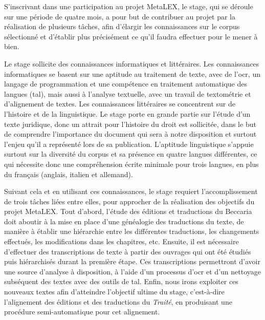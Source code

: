 
S'inscrivant dans une participation au projet MetaLEX, le stage, qui se déroule sur une période de quatre mois, a pour but de contribuer au projet par la réalisation de plusieurs tâches, afin d'élargir les connaissances sur le corpus sélectionné et d'établir plus précisément ce qu'il faudra effectuer pour le mener à bien.

Le stage sollicite des connaissances informatiques et littéraires. Les connaissances informatiques se basent sur une aptitude au traitement de texte, avec de l'\acrshort{ocr}, un langage de programmation et une compétence en traitement automatique des langues (\acrshort{tal}), mais aussi à l'analyse textuelle, avec un travail de textométrie et d'alignement de textes. Les connaissances littéraires se concentrent sur de l'histoire et de la linguistique. Le stage porte en grande partie sur l'étude d'un texte juridique, donc un attrait pour l'histoire du droit est sollicitée, dans le but de comprendre l'importance du document qui sera à notre disposition et surtout l'enjeu qu'il a représenté lors de sa publication. L'aptitude linguistique s'appuie surtout sur la diversité du corpus et sa présence en quatre langues différentes, ce qui nécessite donc une compréhension écrite minimale pour trois langues, en plus du français (anglais, italien et allemand).

Suivant cela et en utilisant ces connaissances, le stage requiert l'accomplissement de trois tâches liées entre elles, pour approcher de la réalisation des objectifs du projet MetaLEX. Tout d'abord, l'étude des éditions et traductions du Beccaria doit aboutir à la mise en place d'une généalogie des traductions du texte, de manière à établir une hiérarchie entre les différentes traductions, les changements effectués, les modifications dans les chapitres, etc. Ensuite, il est nécessaire d'effectuer des transcriptions de texte à partir des ouvrages qui ont été étudiés puis hiérarchisés durant la première étape. Ces transcriptions permettront d'avoir une source d'analyse à disposition, à l'aide d'un processus d'\acrshort{ocr} et d'un nettoyage subséquent des textes avec des outils de \acrlong{tal}. Enfin, nous irons exploiter ces nouveaux textes afin d'atteindre l'objectif ultime du stage, c'est-à-dire l'alignement des éditions et des traductions du \emph{Traité}, en produisant une procédure semi-automatique pour cet alignement. \pagebreak

